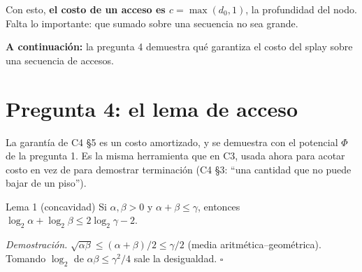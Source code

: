 \documentclass[11pt]{article}
\begin{document}
Con esto, \textbf{el costo de un acceso es $c=\max(d_0,1)$}, la profundidad del nodo. Falta lo importante: que
sumado sobre una secuencia no sea grande.

\textbf{A continuación:} la pregunta 4 demuestra qué garantiza el costo del splay sobre una secuencia de accesos.

\section{Pregunta 4: el lema de acceso}

La garantía de C4 §5 es un costo amortizado, y se demuestra con el potencial $\Phi$ de la pregunta 1. Es la
misma herramienta que en C3, usada ahora para acotar costo en vez de para demostrar terminación (C4 §3: ``una cantidad que no puede bajar de un piso'').

\begin{resultado}{Lema 1 (concavidad)}
Si $\alpha,\beta>0$ y $\alpha+\beta\le\gamma$, entonces $\log_2\alpha+\log_2\beta\le2\log_2\gamma-2$.
\end{resultado}
\textit{Demostración.} $\sqrt{\alpha\beta}\le(\alpha+\beta)/2\le\gamma/2$ (media aritmética--geométrica). Tomando
$\log_2$ de $\alpha\beta\le\gamma^2/4$ sale la desigualdad. $\square$
\end{document}
